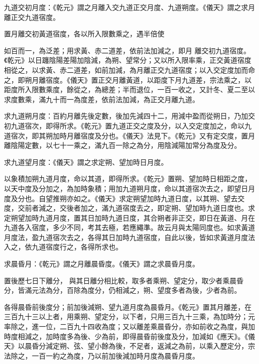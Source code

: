\begin{pinyinscope}
 九道交初月度：《乾元》謂之月離入交九道正交月度、九道朔度。《儀天》謂之求月離正交九道宿度。



 置月離交初黃道宿度，各以所入限數乘之，遇半倍使



 如百而一，為泛差；用求黃、赤二道差，依前法加減之，即月
 離交初九道宿度。《乾元》以日躔陰陽差陽加陰減，為朔、望常分；又以所入限率乘，正交黃道宿度相從之，以求黃、赤二道差，如前加減，為月離正交九道宿度；以入交定度加而命之，即朔月離宿度。《儀天》置正交月離黃道，以距度下月九道差，宗法乘之，以距度所入限數乘度，餘從之，為總差；半而退位，一百一收之，又計冬、夏二至以求度數乘，滿九十而一為度差，依前法加減，為正交月離九道。



 求九道朔月度：百約月離先後定數，後加先減四十二，用減中盈而從朔日，乃加交初九道宿次，即得所求。《乾元》置九道正交之度及分，以入交定度加之，命以九道宿次，即其朔加時月離宿度及分也。《儀天》法見下。《乾元》又有定交度，置月離陰陽定數，以七十一乘之，滿九百一除之為分，用陰減陽加常分為度及分。



 求九道望月度：《儀天》謂之求定朔、望加時日月度。



 以象積加朔九道月度，命以其道，即得所求。《乾元》置朔、望加時日相距之度，以天中度及分加之，為加時象積；用加九道朔月度，命以其道宿次去之，即望日月度及分也。自望推朔亦如之。《儀天》求定朔望加時九道日度，以其朔、望去交度，交前者減之，交後者加之，滿九道宿度去之，即定朔、望加時九道日度也。求定朔望加時九道月度，置其日加時九道日度，其合朔者非正交，即日在黃道、月在九道各入宿度，多少不同，考其去極，若應繩準。故云月與太陽同度也。如求黃道月度法，盈九道宿次去之，各得其日加時九道宿度，自此以後，皆如求黃道月度法入之，依九道宿度行之，各得所求也。



 求晨昏月：《乾元》謂之月離晨昏度。《儀天》謂之求晨昏月度。



 置後歷七日下離分，
 與其日離分相比較，取多者乘朔、望定分，取少者乘晨昏分，皆滿元法為分，百除為度分，仍相減之，朔、望度多者為後，少者為前。



 各得晨昏前後度分；前加後減朔、望九道月度為晨昏月。《乾元》置其月離差，在三百九十三以上者，用乘朔、望定分，以下者，只用三百九十三乘，為加時分；元率除之，進一位，二百九十四收為度；又以離差乘晨昏分，亦如前收之為度，與加時度相減之，加時度多為後、少為前，即得晨昏前後度及分，加減如《應天》。《儀天》以晨昏分減定朔、弦、望小餘為後，不足者，返減之為前，以乘入歷定分，宗法除之，一百一約之為度，乃以前加後減加時月度為晨昏月度。




\end{pinyinscope}
